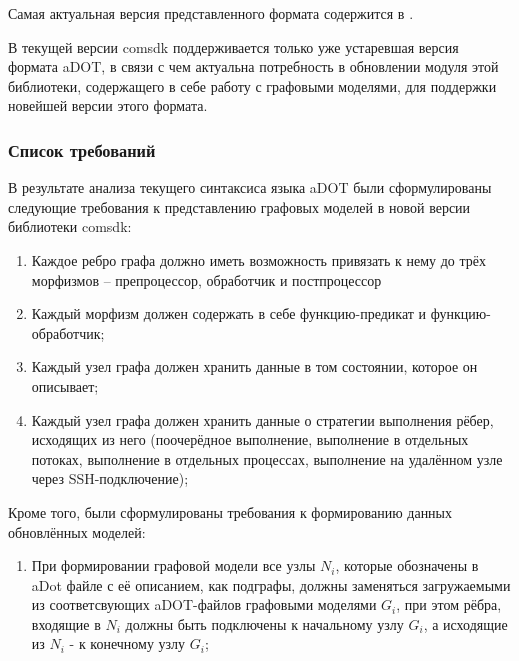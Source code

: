 Самая актуальная версия представленного формата содержится в \cite{SokolovADOT2020}.

В текущей версии comsdk поддерживается только уже устаревшая версия формата aDOT, в связи с чем актуальна потребность в обновлении модуля этой библиотеки, содержащего в себе работу с графовыми моделями, для поддержки новейшей версии этого формата.

\subsubsection{Список требований}
В результате анализа текущего синтаксиса языка aDOT были сформулированы следующие требования к представлению графовых моделей в новой версии библиотеки comsdk:
\begin{enumerate}[label=\arabic*)]
    \item Каждое ребро графа должно иметь возможность привязать к нему до трёх морфизмов -- препроцессор, обработчик и постпроцессор
    \item Каждый морфизм должен содержать в себе функцию-предикат и функцию-обработчик;
    \item Каждый узел графа должен хранить данные в том состоянии, которое он описывает;
    \item Каждый узел графа должен хранить данные о стратегии выполнения рёбер, исходящих из него (поочерёдное выполнение, выполнение в отдельных потоках, выполнение в отдельных процессах, выполнение на удалённом узле через SSH-подключение);
\end{enumerate}

Кроме того, были сформулированы требования к формированию данных обновлённых моделей:
\begin{enumerate}
    \item При формировании графовой модели все узлы $N_i$, которые обозначены в aDot файле с её описанием, как подграфы, должны заменяться загружаемыми из соответсвующих aDOT-файлов графовыми моделями $G_i$, при этом рёбра, входящие в $N_i$ должны быть подключены к начальному узлу $G_i$, а исходящие из $N_i$ - к конечному узлу $G_i$;
\end{enumerate}

\noteattributes{}
